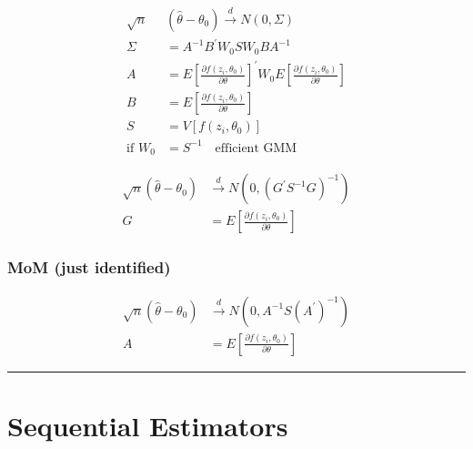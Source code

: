 \begin{align*}
    \sqrt{n}&\left(\widehat{\theta}-\theta_0\right) \stackrel{d}{\longrightarrow} N(0, \Sigma) \\
    \Sigma &= A^{-1} B^\prime W_0 S W_0 B A^{-1} \\
    A &= E\left[\frac{\partial f\left(z_i, \theta_0\right)}{\partial \theta}\right]^{\prime} W_0 E\left[\frac{\partial f\left(z_i, \theta_0\right)}{\partial \theta}\right] \\
    B &= E\left[\frac{\partial f\left(z_i, \theta_0\right)}{\partial \theta}\right] \\
    S&=V\left[f\left(z_i, \theta_0\right)\right] \\
    \text{if } W_0 &= S^{-1} \quad\text{efficient GMM}
\end{align*}

\begin{align*}
    \sqrt{n}\left(\widehat{\theta}-\theta_0\right) &\stackrel{d}{\longrightarrow} N\left(0, \left( G^\prime S^{-1} G\right)^{-1}\right) \\
    G &= E\left[\frac{\partial f\left(z_i, \theta_0\right)}{\partial \theta}\right]
\end{align*}

\subsubsection{MoM (just identified)}

\begin{align*}
    \sqrt{n}\left(\widehat{\theta}-\theta_0\right) &\stackrel{d}{\longrightarrow} 
    N\left(0, A^{-1} S (A^\prime)^{-1} \right) \\
    A &= E\left[\frac{\partial f\left(z_i, \theta_0\right)}{\partial \theta}\right]
\end{align*}

\hrule
\section{Sequential Estimators}

